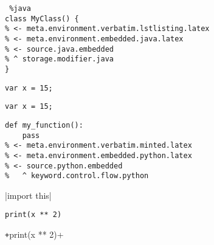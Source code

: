 \documentclass[12pt]{article}
\begin{document}
\begin{lstlisting} %java
class MyClass() {
% <- meta.environment.verbatim.lstlisting.latex
% <- meta.environment.embedded.java.latex
% <- source.java.embedded
% ^ storage.modifier.java
}
\end{lstlisting}

\lstinline{var x = 15;}

\lstinline|var x = 15;|



\begin{verbatim}
def my_function():
    pass
% <- meta.environment.verbatim.minted.latex
% <- meta.environment.embedded.python.latex
% <- source.python.embedded
%   ^ keyword.control.flow.python
\end{verbatim}



|import this|


\texttt{print(x ** 2)}

\texttt+print(x ** 2)+



\end{document}
